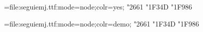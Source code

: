 





\font\Emoji={file:seguiemj.ttf:mode=node;colr=yes;}
     \Emoji \char"2661 \char"1F34D \char"1F986

\font\Emoji={file:seguiemj.ttf:mode=node;colr=demo;}
     \Emoji \char"2661 \char"1F34D \char"1F986


\bye